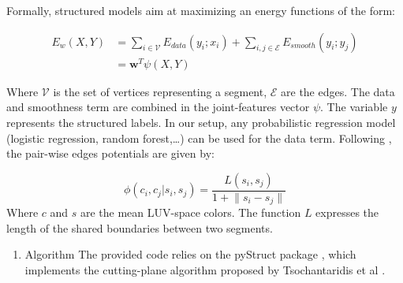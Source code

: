 \documentclass[10pt,conference,compsocconf]{IEEEtran}
\begin{document}
Formally, structured models aim at maximizing an energy functions of the form:

 \begin{equation}
 \begin{split}
E_w(X,Y) &= \sum_{i \in \mathcal{V}} E_{data}(y_i;x_i) + \sum_{i,j \in \mathcal{E}} E_{smooth}(y_i;y_j) \\
 &= \mathbf{w}^T \psi(X,Y)
 \end{split}
 \end{equation}

Where \(\mathcal{V}\) is the set of vertices representing a segment, \(\mathcal{E}\) are the edges. The data and smoothness term are combined in the joint-features vector \(\psi\). The variable \(y\) represents the structured labels. In our setup, any probabilistic regression model (logistic regression, random forest,\ldots{}) can be used for the data term. Following \cite{fulkerson09}, the pair-wise edges potentials are given by:

 \begin{equation}
\phi(c_i,c_j|s_i,s_j) = \frac{L(s_i,s_j)}{1+\lVert s_i - s_j \rVert}
 \end{equation}
Where \(c\) and \(s\) are the mean LUV-space colors. The function \(L\) expresses the length of the shared boundaries between two segments.
\begin{enumerate}
\item Algorithm
\label{sec:orgheadline10}
The provided code relies on the pyStruct package \cite{muller14}, which implements the cutting-plane algorithm proposed by Tsochantaridis et al \cite{tsochantaridis05}.
\end{enumerate}
\end{document}
